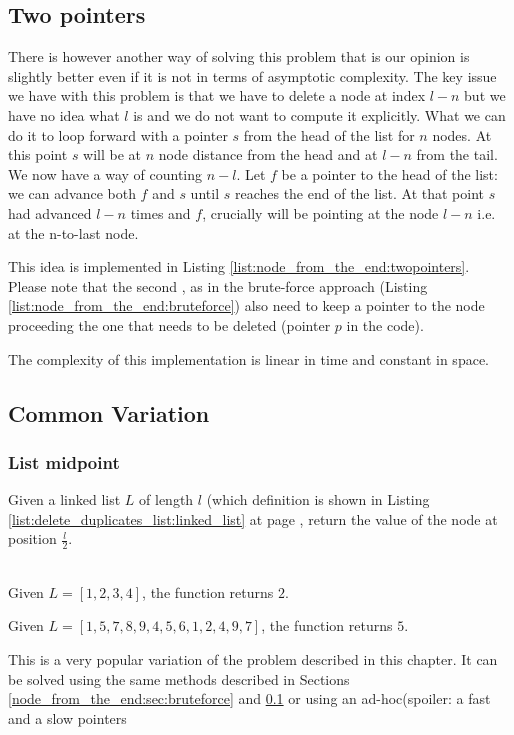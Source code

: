 \subsection{Two pointers}
\label{node_from_the_end:sec:twopointers}
There is however another way of solving this problem that is our opinion is slightly better even if it is not in terms of asymptotic complexity. 
The key issue we have with this problem is that we have to delete a node at index $l-n$ but we have no idea what $l$ is and we do not want to compute it explicitly. 
What we can do it to loop forward with a pointer $s$ from the head of the list for $n$ nodes. At this point $s$ will be at $n$ node distance from the head and at $l-n$ from the tail. We now have a way of counting $n-l$. Let $f$ be a pointer to the head of the list: we can advance both $f$ and $s$ until $s$ reaches the end of the list. At that point $s$ had advanced $l-n$ times and $f$, crucially will be pointing at the node $l-n$ i.e. at the n-to-last node.

This idea is implemented in Listing \ref{list:node_from_the_end:twopointers}. Please note that the second , as in the brute-force approach (Listing \ref{list:node_from_the_end:bruteforce}) also need to keep a pointer to the node proceeding the one that needs to be deleted (pointer $p$ in the code).

The complexity of this implementation is linear in time and constant in space.




\subsection{Common Variation}
\subsubsection{List midpoint}
\label{node_from_the_end:sec:list_midpoint}

\begin{exercise}
Given a linked list $L$ of length $l$ (which definition is shown in Listing \ref{list:delete_duplicates_list:linked_list} at page \pageref{list:delete_duplicates_list:linked_list} , return the value of the node at position $\frac{l}{2}$.
\begin{example}
	\hfill \\
	Given $L=[1,2,3,4]$, the function returns $2$.
\end{example}

\begin{example}
	Given $L=[1,5,7,8,9,4,5,6,1,2,4,9,7]$, the function returns $5$.
\end{example}
\end{exercise}
This is a very popular variation of the problem described in this chapter. It can be solved using the same methods described in Sections \ref{node_from_the_end:sec:bruteforce} and \ref{node_from_the_end:sec:twopointers} or using an ad-hoc(spoiler: a fast and a slow pointers